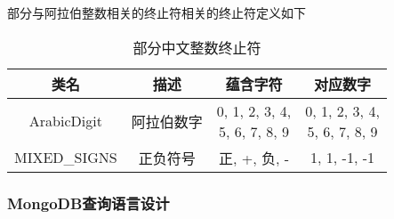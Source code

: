 部分与阿拉伯整数相关的终止符相关的终止符定义如下

\begin{table}[h]
    \centering
    \caption{部分中文整数终止符}
    \begin{tabular}{*{4}{c}}
        \toprule
        类名         & 描述       & 蕴含字符                     & 对应数字     \\
        \midrule
        ArabicDigit  & 阿拉伯数字 & \makecell*[c]{0, 1, 2, 3, 4,                \\ 5, 6, 7, 8, 9} & \makecell*[c]{0, 1, 2, 3, 4, \\ 5, 6, 7, 8, 9}         \\
        MIXED\_SIGNS & 正负符号   & 正, +, 负, -                 & 1, 1, -1, -1 \\
        \bottomrule
    \end{tabular}
\end{table}

\subsubsection{MongoDB查询语言设计}

